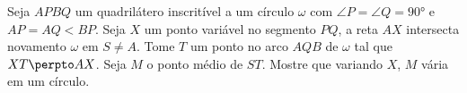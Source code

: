 Seja $APBQ$ um quadrilátero inscritível a um círculo $\omega$ com $\angle P = \angle Q = 90°$ e $AP=AQ < BP$. Seja $X$ um ponto variável no segmento $PQ$, a reta $AX$ intersecta novamento $\omega$ em $S \ne A$. Tome $T$ um ponto no arco $AQB$ de $\omega$ tal que $XT \perpto AX$. Seja $M$ o ponto médio de $ST$. Mostre que variando $X$, $M$ vária em um círculo.